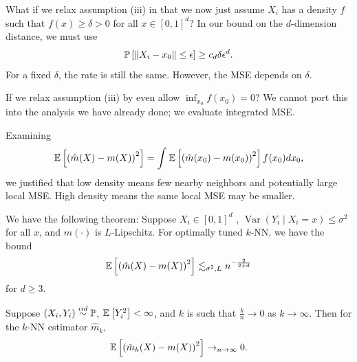 What if we relax assumption (iii) in that we now just assume $X_i$ has a density $f$ such that $f(x) \ge \delta > 0$ for all $x \in [0,1]^{d}$? In our bound on the $d$-dimension distance, we must use \[
	\P\left[\|X_i - x_0\| \le \epsilon\right] \ge c_d \delta \epsilon^{d}		
.\] For a fixed $\delta$, the rate is still the same. However, the MSE depends on $\delta$.

If we relax assumption (iii) by even allow $\inf_{x_0}f(x_0) = 0$? We cannot port this into the analysis we have already done; we evaluate integrated MSE. 

\begin{aside}
		Examining
		\[
			\E\left[\left( \hat{m}(X) - m(X) \right)^2\right]
			= \int_{}^{} \E\left[\left( \hat{m}(x_0) - m(x_0) \right)^2\right] f(x_0)dx_0
		,\]
		we justified that low density means few nearby neighbors and potentially large local MSE.
		High density means the same local MSE may be smaller.

	We have the following theorem: \newline Suppose $X_i \in [0,1]^{d}$ , $\operatorname{Var}\left(Y_i \mid X_i = x\right) \le \sigma^2$ for all $x$, and $m(\cdot)$ is $L$-Lipschitz. For optimally tuned $k$-NN, we have the bound \[
		\E\left[\left( \hat{m}(X) - m(X) \right)^2\right] \lesssim_{\sigma^2,L} n^{-\frac{2}{2+d}}
	\] for $d \ge 3$.
\end{aside}

\begin{theorem}
	Suppose $(X_i,Y_i) \overset{iid}{\sim} \P$, $\E\left[Y_i^2\right] < \infty$, and $k$ is such that $\frac{k}{n} \to 0$ as $k \to \infty$. Then for the $k$-NN estimator $\hat{m}_k$, \[
		\E\left[\left( \hat{m}_k(X) - m(X) \right)^2\right] \to_{n\to \infty} 0
	.\] 
\end{theorem}
